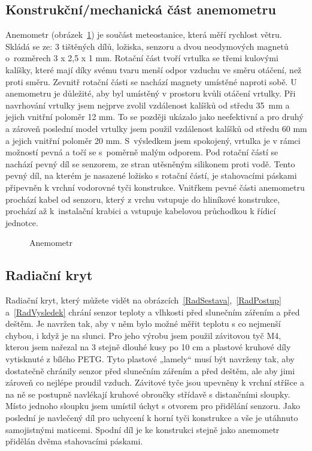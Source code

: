         \subsection{Konstrukční/mechanická část anemometru}
            Anemometr (obrázek~\ref{Anemometr}) je součást meteostanice, která měří rychlost větru. Skládá se ze: 3 tištěných dílů, ložiska, senzoru a dvou neodymových magnetů o~rozměrech 3 x 2,5 x 1 mm. Rotační část tvoří vrtulka se třemi kulovými kalíšky, které mají díky svému tvaru menší odpor vzduchu ve směru otáčení, než proti směru. Zevnitř rotační části se nachází magnety umístěné naproti sobě. U anemometru je důležité, aby byl umístěný v prostoru kvůli otáčení vrtulky. Při navrhování vrtulky jsem nejprve zvolil vzdálenost kalíšků od středu 35~mm a jejich vnitřní poloměr 12 mm. To se později ukázalo jako neefektivní a pro druhý a zároveň poslední model vrtulky jsem použil vzdálenost kalíšků od středu 60 mm a jejich vnitřní poloměr 20 mm. S~výsledkem jsem spokojený, vrtulka je v rámci možností pevná a točí se s~poměrně malým odporem. Pod rotační částí se nachází pevný díl se senzorem, ze stran utěsněným silikonem proti vodě. Tento pevný díl, na kterém je nasazené ložisko s rotační částí, je stahovacími páskami připevněn k vrchní vodorovné tyči konstrukce. Vnitřkem pevné části anemometru prochází kabel od senzoru, který z vrchu vstupuje do hliníkové konstrukce, prochází až k~instalační krabici a vstupuje kabelovou průchodkou k řídicí jednotce.

            \begin{figure}[htb]
            \caption{Anemometr}
            \label{Anemometr}
            \end{figure}

        \clearpage

        \subsection{Radiační kryt}
            Radiační kryt, který můžete vidět na obrázcích~\ref{RadSestava},~\ref{RadPostup} a~\ref{RadVysledek} chrání senzor teploty a vlhkosti před slunečním zářením a před deštěm. Je navržen tak, aby v něm bylo možné měřit teplotu s co nejmenší chybou, i když je na slunci. Pro jeho výrobu jsem použil závitovou tyč M4, kterou jsem nařezal na 3 stejně dlouhé kusy po 10 cm a plastové kruhové díly vytisknuté z bílého PETG. Tyto plastové „lamely“ musí být  navrženy tak, aby dostatečně chránily senzor před slunečním zářením a před deštěm, ale aby jimi zároveň co nejlépe proudil vzduch. Závitové tyče jsou upevněny k vrchní stříšce a na ně se postupně navlékají kruhové obroučky střídavě s distančními sloupky. Místo jednoho sloupku jsem umístil úchyt s otvorem pro přidělání senzoru. Jako poslední je navlečený díl pro uchycení k horní tyči konstrukce a vše je utáhnuto samojistnými maticemi. Spodní díl je ke konstrukci stejně jako anemometr přidělán dvěma stahovacími páskami.


